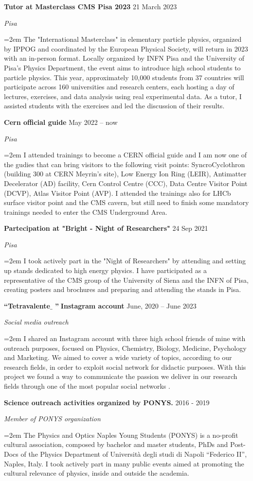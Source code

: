 \documentclass[fontsize=12pt]{article} %
\newcommand{\openquote}{``}
\newcommand{\closequote}{''}
\newcommand{\sepspacesmall}{\vspace*{0.3em}}
\newcommand{\EducationEntry}[4]{
	\noindent \textbf{#1} \hfill      %
	{#2} \par  %
	\noindent \textit{#3} \par        %
	\noindent\hangindent=2em\hangafter=0 \small #4 %
	\normalsize \par}
\begin{document}
     \sepspacesmall
     \EducationEntry{Tutor at Masterclass CMS Pisa 2023}{21 March 2023}{Pisa}{The "International Masterclass" in elementary particle physics, organized by IPPOG and coordinated by the European Physical Society, will return in 2023 with an in-person format. Locally organized by INFN Pisa and the University of Pisa’s Physics Department, the event aims to introduce high school students to particle physics. This year, approximately 10,000 students from 37 countries will participate across 160 universities and research centers, each hosting a day of lectures, exercises, and data analysis using real experimental data. As a tutor, I assisted students with the exercises and led the discussion of their results. \cite{masterclasspisa}}
     \sepspacesmall
     \EducationEntry{Cern official guide}{May 2022 {--} now}{Pisa}{I attended trainings to become a CERN official guide and I am now one of the gudies that can bring visitors to the following visit points: SyncroCyclothron (building 300 at CERN Meyrin's site), Low Energy Ion Ring (LEIR), Antimatter Decelerator (AD) facility, Cern Control Centre (CCC), Data Centre Visitor Point (DCVP), Atlas Visitor Point (AVP). I attended the trainings also for LHCb surface visitor point and the CMS cavern, but still need to finish some mandatory trainings needed to enter the CMS Underground Area.}
     \sepspacesmall
    \EducationEntry{Partecipation at "Bright - Night of Researchers" }{24 Sep 2021}{Pisa}{I took actively part in the "Night of Researchers" by attending and setting up stands dedicated to high energy physics. I have participated as a representative of the CMS group of the University of Siena and the INFN of Pisa, creating posters and brochures and preparing and attending the stands in Pisa.}
     \sepspacesmall
	\EducationEntry{\openquote Tetravalente$\_$ \closequote $\;$Instagram account}{June, 2020 {--} June 2023}{Social media outreach}{
	I shared an Instagram account with three high school friends of mine with outreach purposes, focused on Physics, Chemistry, Biology, Medicine, Psychology and Marketing. We aimed to cover a wide variety of topics, according to our research fields, in order to exploit social network for didactic purposes. With this project we found a way to communicate the passion we deliver in our research fields through one of the most popular social networks \cite{tetravalente}.\\}
     \sepspacesmall
	\EducationEntry{Science outreach activities organized by PONYS.}{2016 - 2019}{Member of PONYS organization}{The Physics and Optics Naples Young Students (PONYS) is a no-profit cultural association, composed by bachelor and master students, PhDs and Post-Docs of the Physics Department of Università degli studi di Napoli \openquote Federico II\closequote, Naples, Italy. I took actively part in many public events aimed at promoting the cultural relevance of physics, inside and outside the academia.
	}
\end{document}
